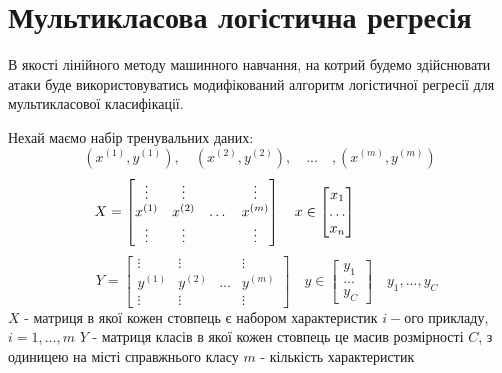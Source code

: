 \documentclass[a4paper,14pt]{extreport}
\begin{document}
	\section{Мультикласова логістична регресія}
	\label{sec:lg}
	В якості лінійного методу машинного навчання, на котрий будемо здійснювати атаки буде використовуватись модифікований алгоритм логістичної регресії для мультикласової класифікації. \par
	Нехай маємо набір тренувальних даних:
	\begin{equation*}
		(x^{(1)}, y^{(1)}), \quad (x^{(2)}, y^{(2)}), \quad ... \quad ,(x^{(m)}, y^{(m)})
	\end{equation*}
	\begin{equation*}
		\quad
		X =	
		\begin{bmatrix}
		\vdots  & \vdots  & & \vdots \\
		x^{(1)} & x^{(2)} &   \dots & x^{(m)}\\
		\vdots  & \vdots  & & \vdots
		\end{bmatrix}
		\quad
		x \in
		\begin{bmatrix}
		x_1   \\
		\dots \\
		x_n
		\end{bmatrix}
		\hspace{21 mm}
	\end{equation*}
	\begin{equation*}
		\quad
		Y =	
		\begin{bmatrix}
		\vdots  & \vdots  & & \vdots \\
		y^{(1)} & y^{(2)} &   \dots & y^{(m)}\\
		\vdots  & \vdots  & & \vdots
		\end{bmatrix}
		\quad
		y \in
		\begin{bmatrix}
		y_1   \\
		\dots \\
		y_C
		\end{bmatrix}
		\quad
		y_1, ..., y_C
	\end{equation*}
	\newline
	$X$ - матриця в якої кожен стовпець є набором характеристик $i-$ого прикладу, \newline $i=1,\dots,m$ 
	\newline
	$Y$ - матриця класів в якої кожен стовпець це масив розмірності $C$, з одиницею на місті справжнього класу
	\newline
	$m$ - кількість характеристик
	\newline
\end{document}
